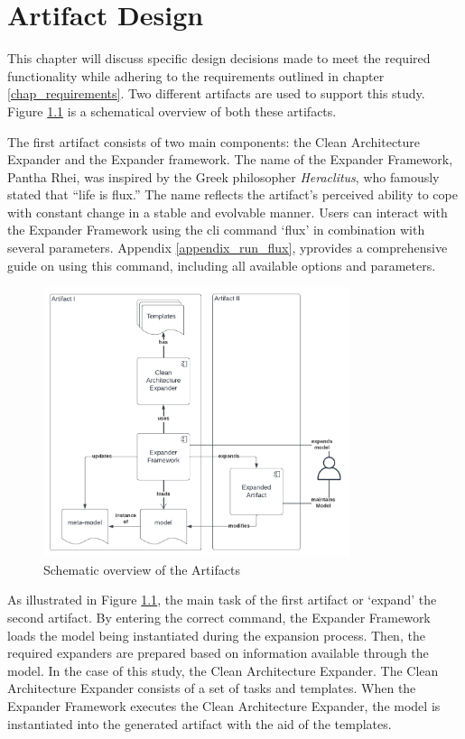 \chapter{Artifact Design} \label{chap_designing_artifacts}

This chapter will discuss specific design decisions made to meet the required
functionality while adhering to the requirements outlined in chapter
\ref{chap_requirements}. Two different artifacts are used to support this study. Figure
\ref{fig_overview_design} is a schematical overview of both these artifacts.

The first artifact consists of two main components: the Clean Architecture Expander and
the Expander framework. The name of the Expander Framework, Pantha Rhei, was inspired by
the Greek philosopher \emph{Heraclitus}, who famously stated that \enquote{life is flux.}
The name reflects the artifact's perceived ability to cope with constant change in a
stable and evolvable manner. Users can interact with the Expander Framework using the
\gls{cli} command \enquote*{flux} in combination with several parameters. Appendix
\ref{appendix_run_flux}, yprovides a comprehensive guide on using this command, including
all available options and parameters.



\begin{figure}[H]
    \centering
    \includegraphics[width=0.8\textwidth]{figures/artifactOverview.pdf}
    \caption[Schematic overview of the Artifacts]{Schematic overview of the Artifacts}
    \label{fig_overview_design}
  \end{figure}

  As illustrated in Figure \ref{fig_overview_design}, the main task of the first artifact
  or \enquote*{expand} the second artifact. By entering the correct command, the Expander
  Framework loads the model being instantiated during the expansion process. Then, the
  required expanders are prepared based on information available through the model. In the
  case of this study, the Clean Architecture Expander. The Clean Architecture Expander
  consists of a set of tasks and templates. When the Expander Framework executes the Clean
  Architecture Expander, the model is instantiated into the generated artifact with the
  aid of the templates.

